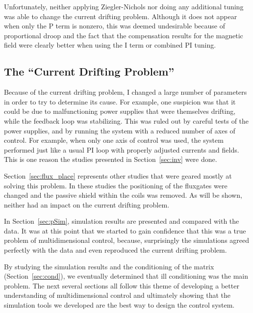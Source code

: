 Unfortunately, neither applying Ziegler-Nichols nor doing any
additional tuning was able to change the current drifting problem.
Although it does not appear when only the P term is nonzero, this was
deemed undesirable because of proportional droop and the fact that the
compensation results for the magnetic field were clearly better when
using the I term or combined PI tuning.

\subsection{The ``Current Drifting Problem''}

Because of the current drifting problem, I changed a large number of
parameters in order to try to determine its cause.  For example, one
suspicion was that it could be due to malfunctioning power supplies
that were themselves drifting, while the feedback loop was
stabilizing.  This was ruled out by careful tests of the power
supplies, and by running the system with a reduced number of axes of
control.  For example, when only one axis of control was used, the
system performed just like a usual PI loop with properly adjusted
currents and fields.  This is one reason the studies presented in
Section~\ref{sec:inv} were done.

Section~\ref{sec:flux_place} represents other studies that were geared
mostly at solving this problem.  In these studies the positioning of
the fluxgates were changed and the passive shield within the coils was
removed.  As will be shown, neither had an impact on the current
drifting problem.

In Section~\ref{sec:pSim}, simulation results are presented and
compared with the data.  It was at this point that we started to gain
confidence that this was a true problem of multidimensional control,
because, surprisingly the simulations agreed perfectly with
the data and even reproduced the current drifting problem.

By studying the simulation results and the conditioning of the
matrix (Section~\ref{sec:cond}), we eventually determined that
ill conditioning was the main problem.  The next several sections all
follow this theme of developing a better understanding of
multidimensional control and ultimately showing that the simulation tools
we developed are the best way to design the control system.


